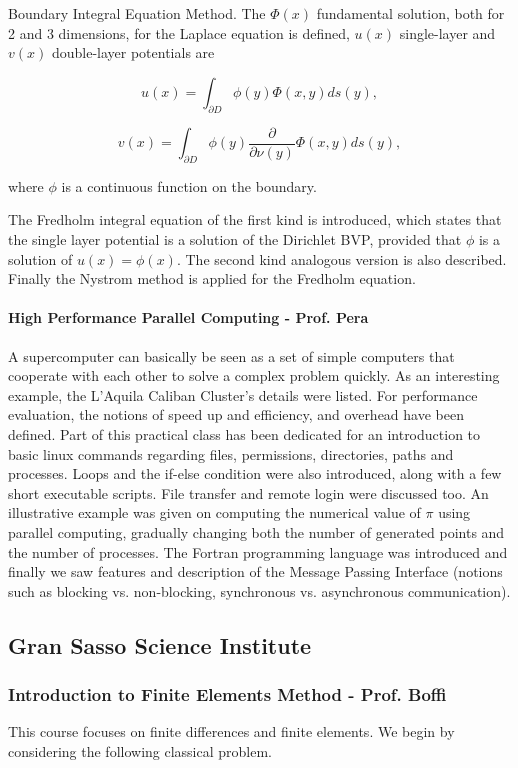 \documentclass{article}
\begin{document}
\begin{outline}[enumerate]
\1 Boundary Integral Equation Method. The $\Phi (x)$ fundamental solution, both for 2 and 3 dimensions, for the Laplace equation is defined, $u(x)$ single-layer and $v(x)$ double-layer potentials are

\[ u(x) = \int_{\partial D} \phi(y) \Phi(x,y) ds(y),\]

\[ v(x) = \int_{\partial D} \phi(y) \frac{\partial}{\partial \nu(y)}\Phi(x,y) ds(y),\]

where $\phi$ is a continuous function on the boundary.

The Fredholm integral equation of the first kind is introduced, which states that the single layer potential is a solution of the Dirichlet BVP, provided that $\phi$ is a solution of $u(x) = \phi (x). $ The second kind analogous version is also described. Finally the Nystrom method is applied for the Fredholm equation.

\end{outline}

\paragraph{High Performance Parallel Computing - Prof. Pera}

A supercomputer can basically be seen as a set of simple computers that cooperate with each other to solve a complex problem quickly. As an interesting example, the L'Aquila Caliban Cluster's details were listed. For performance evaluation, the notions of speed up and efficiency, and overhead have been defined.
Part of this practical class has been dedicated for an introduction to basic linux commands regarding files, permissions, directories, paths and processes. Loops and the if-else condition were also introduced, along with a few short executable scripts. File transfer and remote login were discussed too.
An illustrative example was given on computing the numerical value of $\pi$ using parallel computing, gradually changing both the number of generated points and the number of processes.
The Fortran programming language was introduced and finally we saw features and description of the Message Passing Interface (notions such as blocking vs. non-blocking, synchronous vs. asynchronous communication).

\subsection{Gran Sasso Science Institute}

\subsubsection{Introduction to Finite Elements Method - Prof. Boffi}
This course focuses on finite differences and finite elements. We begin by considering the following classical problem.
\end{document}
